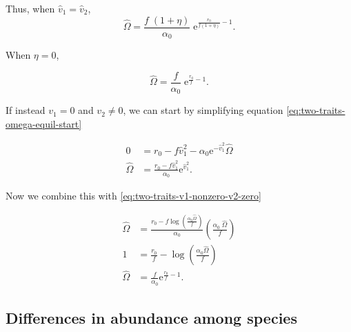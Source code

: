 Thus, when $\hat{v}_1 = \hat{v}_2$,
$$
\hat{\Omega} = \frac{ f \; ( 1 + \eta ) }{ \alpha_0 } \;
        \textrm{e}^{\frac{ r_0 }{ f ( 1 + \eta ) } - 1 }
    \textrm{.}
$$


\noindent When $\eta = 0$,

$$
    \hat{\Omega} = \frac{ f }{ \alpha_0 } \; \textrm{e}^{\frac{ r_0 }{ f } - 1 }
    \textrm{.}
$$



If instead $v_1 = 0$ and $v_2 \ne 0$, we can start by simplifying equation
\ref{eq:two-traits-omega-equil-start}

\begin{equation*}
\begin{split}
    0 &= r_0 - f \hat{v}_{1}^2 -
        \alpha_0 \textrm{e}^{ - \hat{v}_{1}^2 } \hat{\Omega} \\
    \hat{\Omega} &= \frac{ r_0 - f \hat{v}_{1}^2 }{ \alpha_0 } \textrm{e}^{ \hat{v}_{1}^2 }
    \textrm{.}
\end{split}
\end{equation*}

Now we combine this with \ref{eq:two-traits-v1-nonzero-v2-zero}

\begin{equation*}
\begin{split}
    \hat{\Omega} &= \frac{ r_0 - f \log \left( \frac{\alpha_0 \hat{\Omega}}{f} \right) }{
        \alpha_0 } \left( \frac{\alpha_0 \; \hat{\Omega}}{f} \right) \\
    1 &= \frac{ r_0 }{ f } - \log \left( \frac{\alpha_0 \hat{\Omega}}{f} \right) \\
    \hat{\Omega} &= \frac{f}{\alpha_0} \textrm{e}^{\frac{r_0}{f} - 1}
    \textrm{.}
\end{split}
\end{equation*}

















\subsection*{Differences in abundance among species}



